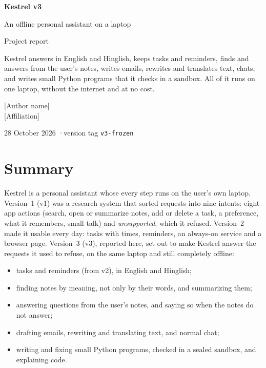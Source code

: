 \documentclass[11pt,a4paper]{article}
\begin{document}
\begin{titlepage}
\centering
\vspace*{3cm}
{\Huge\bfseries Kestrel v3\par}
\vspace{6pt}
{\Large An offline personal assistant on a laptop\par}
\vspace{1.2cm}
{\large Project report\par}
\vspace{2cm}
\begin{minipage}{0.78\textwidth}\centering
Kestrel answers in English and Hinglish, keeps tasks and reminders, finds and answers from the user's notes, writes
emails, rewrites and translates text, chats, and writes small Python programs that it checks in a sandbox. All of it
runs on one laptop, without the internet and at no cost.
\end{minipage}
\vfill
{\large [Author name] \\ {[Affiliation]}\par}
\vspace{6pt}
28 October 2026 \quad·\quad version tag \texttt{v3-frozen}
\end{titlepage}

\tableofcontents
\newpage

\section{Summary}

Kestrel is a personal assistant whose every step runs on the user's own laptop. Version~1 (v1) was a research system
that sorted requests into nine intents: eight app actions (search, open or summarize notes, add or delete a task, a
preference, what it remembers, small talk) and \emph{unsupported}, which it refused. Version~2 made it usable every day: tasks with times, reminders, an always-on service and a
browser page. Version~3 (v3), reported here, set out to make Kestrel answer the requests it used to refuse, on the same
laptop and still completely offline:

\begin{itemize}
  \item tasks and reminders (from v2), in English and Hinglish;
  \item finding notes by meaning, not only by their words, and summarizing them;
  \item answering questions from the user's notes, and saying so when the notes do not answer;
  \item drafting emails, rewriting and translating text, and normal chat;
  \item writing and fixing small Python programs, checked in a sealed sandbox, and explaining code.
\end{itemize}
\end{document}

